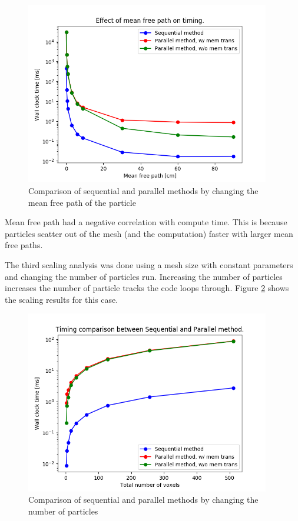 \begin{figure}[]
 \begin{centering}
 \centering
 \includegraphics[width=0.6\linewidth,height=8cm]{../figs/mean_free_path.png}
 \caption{Comparison of sequential and parallel methods by changing the mean free path of the particle}
 \label{mean_free_path}
 \end{centering}
\end{figure}
Mean free path had a negative correlation with compute time. This is because
particles scatter out of the mesh (and the computation) faster with larger mean
free paths.

The third scaling analysis was done using a mesh size with constant parameters and 
changing the number of particles run. Increasing the number of particles increases the 
number of particle tracks the code loops through. Figure \ref{particles} shows the scaling results for this case. 
\begin{figure}[]
 \begin{centering}
 \centering
 \includegraphics[width=0.6\linewidth,height=8cm]{../figs/particles.png}
 \caption{Comparison of sequential and parallel methods by changing the number of particles}
 \label{particles}
 \end{centering}
\end{figure}

